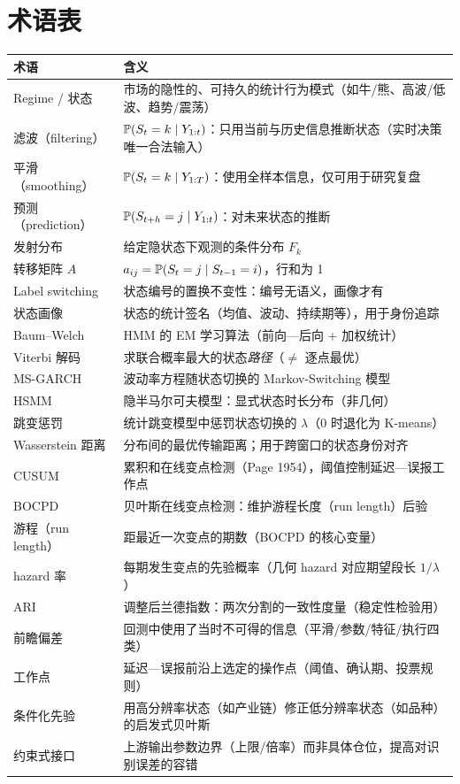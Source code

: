 \section{术语表}

\begin{longtable}{>{\raggedright\arraybackslash}p{3.0cm}>{\raggedright\arraybackslash}p{8.8cm}}
\toprule
\textbf{术语} & \textbf{含义} \\
\midrule
\endhead
Regime / 状态 & 市场的隐性的、可持久的统计行为模式（如牛/熊、高波/低波、趋势/震荡） \\
滤波（filtering） & $\mathbb{P}(S_t = k \mid Y_{1:t})$：只用当前与历史信息推断状态（实时决策唯一合法输入） \\
平滑（smoothing） & $\mathbb{P}(S_t = k \mid Y_{1:T})$：使用全样本信息，仅可用于研究复盘 \\
预测（prediction） & $\mathbb{P}(S_{t+h} = j \mid Y_{1:t})$：对未来状态的推断 \\
发射分布 & 给定隐状态下观测的条件分布 $F_k$ \\
转移矩阵 $A$ & $a_{ij} = \mathbb{P}(S_t = j \mid S_{t-1} = i)$，行和为 1 \\
Label switching & 状态编号的置换不变性：编号无语义，画像才有 \\
状态画像 & 状态的统计签名（均值、波动、持续期等），用于身份追踪 \\
Baum--Welch & HMM 的 EM 学习算法（前向—后向 $+$ 加权统计） \\
Viterbi 解码 & 求联合概率最大的状态\emph{路径}（$\ne$ 逐点最优） \\
MS-GARCH & 波动率方程随状态切换的 Markov-Switching 模型 \\
HSMM & 隐半马尔可夫模型：显式状态时长分布（非几何） \\
跳变惩罚 & 统计跳变模型中惩罚状态切换的 $\lambda$（$0$ 时退化为 K-means） \\
Wasserstein 距离 & 分布间的最优传输距离；用于跨窗口的状态身份对齐 \\
CUSUM & 累积和在线变点检测（Page 1954），阈值控制延迟—误报工作点 \\
BOCPD & 贝叶斯在线变点检测：维护游程长度（run length）后验 \\
游程（run length） & 距最近一次变点的期数（BOCPD 的核心变量） \\
hazard 率 & 每期发生变点的先验概率（几何 hazard 对应期望段长 $1/\lambda$） \\
ARI & 调整后兰德指数：两次分割的一致性度量（稳定性检验用） \\
前瞻偏差 & 回测中使用了当时不可得的信息（平滑/参数/特征/执行四类） \\
工作点 & 延迟—误报前沿上选定的操作点（阈值、确认期、投票规则） \\
条件化先验 & 用高分辨率状态（如产业链）修正低分辨率状态（如品种）的启发式贝叶斯 \\
约束式接口 & 上游输出参数边界（上限/倍率）而非具体仓位，提高对识别误差的容错 \\
\bottomrule
\end{longtable}